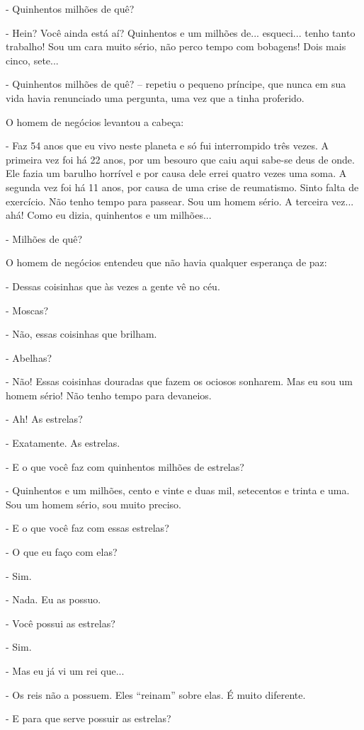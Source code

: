 - Quinhentos milhões de quê?

- Hein? Você ainda está aí? Quinhentos e um milhões de... esqueci...
tenho tanto trabalho! Sou um cara muito sério, não perco tempo com
bobagens! Dois mais cinco, sete...

- Quinhentos milhões de quê? -- repetiu o pequeno príncipe, que nunca em
sua vida havia renunciado uma pergunta, uma vez que a tinha proferido.

O homem de negócios levantou a cabeça:

- Faz 54 anos que eu vivo neste planeta e só fui interrompido três
vezes. A primeira vez foi há 22 anos, por um besouro que caiu aqui
sabe-se deus de onde. Ele fazia um barulho horrível e por causa dele
errei quatro vezes uma soma. A segunda vez foi há 11 anos, por causa de
uma crise de reumatismo. Sinto falta de exercício. Não tenho tempo para
passear. Sou um homem sério. A terceira vez... ahá! Como eu dizia,
quinhentos e um milhões...

- Milhões de quê?

O homem de negócios entendeu que não havia qualquer esperança de paz:

- Dessas coisinhas que às vezes a gente vê no céu.

- Moscas?

- Não, essas coisinhas que brilham.

- Abelhas?

- Não! Essas coisinhas douradas que fazem os ociosos sonharem. Mas eu
sou um homem sério! Não tenho tempo para devaneios.

- Ah! As estrelas?

- Exatamente. As estrelas.

- E o que você faz com quinhentos milhões de estrelas?

- Quinhentos e um milhões, cento e vinte e duas mil, setecentos e trinta
e uma. Sou um homem sério, sou muito preciso.

- E o que você faz com essas estrelas?

- O que eu faço com elas?

- Sim.

- Nada. Eu as possuo.

- Você possui as estrelas?

- Sim.

- Mas eu já vi um rei que...

- Os reis não a possuem. Eles ``reinam'' sobre elas. É muito diferente.

- E para que serve possuir as estrelas?

